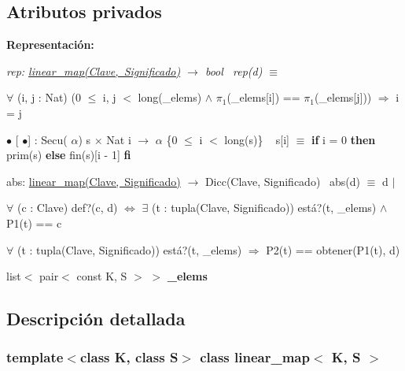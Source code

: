\subsection*{Atributos privados}
\begin{Indent}\textbf{ Representación\+:}\par
{\em rep\+: \mbox{\hyperlink{classlinear__map}{linear\+\_\+map(\+Clave, Significado)}} $\to$ bool~\newline
rep(d) $\equiv$
\begin{DoxyItemize}
\item $\forall$ (i, j \+: Nat) (0 $\leq$ i, j $<$ long(\+\_\+elems) $\land$ $\pi_1$(\+\_\+elems\mbox{[}i\mbox{]}) == $\pi_1$(\+\_\+elems\mbox{[}j\mbox{]})) $\Rightarrow$ i = j
\end{DoxyItemize}

$\bullet$ \mbox{[} $\bullet$\mbox{]} \+: Secu( $\alpha$) s $\times$ Nat i $\rightarrow$ $\alpha$ \{0 $\leq$ i $<$ long(s)\} ~\newline
s\mbox{[}i\mbox{]} $\equiv$ {\bfseries if} i = 0 {\bfseries then} prim(s) {\bfseries else} fin(s)\mbox{[}i -\/ 1\mbox{]} {\bfseries fi} 

abs\+: \mbox{\hyperlink{classlinear__map}{linear\+\_\+map(\+Clave, Significado)}} $\to$ Dicc(\+Clave, Significado)~\newline
abs(d) $\equiv$ d\textquotesingle{} $|$
\begin{DoxyItemize}
\item $\forall$ (c \+: Clave) def?(c, d\textquotesingle{}) $\Leftrightarrow$ $\exists$ (t \+: tupla(\+Clave, Significado)) está?(t, \+\_\+elems) $\land$ P1(t) == c
\item $\forall$ (t \+: tupla(\+Clave, Significado)) está?(t, \+\_\+elems) $\Rightarrow$ P2(t) == obtener(P1(t), d\textquotesingle{}) 
\end{DoxyItemize}}\begin{DoxyCompactItemize}
\item 
\mbox{\label{classlinear__map_aeb6846d41a9b28c5511b1ece965efe61}} 
list$<$ pair$<$ const K, S $>$ $>$ {\bfseries \+\_\+elems}
\end{DoxyCompactItemize}
\end{Indent}


\subsection{Descripción detallada}
\subsubsection*{template$<$class K, class S$>$\newline
class linear\+\_\+map$<$ K, S $>$}


